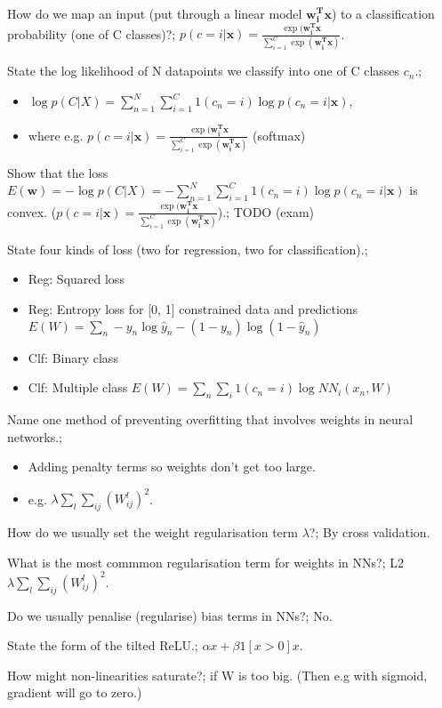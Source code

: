 \documentclass{article}
\begin{document}
How do we map an input (put through a linear model $\bm{w^T_ix}$) to a classification  probability (one of C classes)?; $p(c = i|\bm{x}) = \frac{\exp (\bm{w_i^Tx}}{\sum_{i=1}^C\exp(\bm{w^T_i x})}$.

State the log likelihood of N datapoints we classify into one of C classes $c_n$.; \begin{itemize} \item $\log p(C|X) = \sum_{n=1}^N \sum_{i=1}^C 1(c_n = i)\log  p(c_n = i|\bm{x})$,  \item where e.g. $p(c = i|\bm{x}) = \frac{\exp (\bm{w_i^Tx}}{\sum_{i=1}^C\exp(\bm{w^T_i x})}$ (softmax) \end{itemize}

Show that the loss $E(\bm{w}) = -\log p(C|X) =- \sum_{n=1}^N \sum_{i=1}^C 1(c_n = i)\log p(c_n = i|\bm{x})$ is convex. ($p(c = i|\bm{x}) = \frac{\exp (\bm{w_i^Tx}}{\sum_{i=1}^C\exp(\bm{w^T_i x})}$).; TODO (exam)

State four kinds of loss (two for regression, two for classification).; \begin{itemize} \item Reg: Squared loss \item Reg: Entropy loss for [0, 1] constrained data and predictions $E(W) = \sum_n -y_n\log \hat{y}_n - (1-y_n)\log (1-\hat{y}_n)$ \item Clf: Binary class \item Clf: Multiple class $E(W) = \sum_n\sum_i 1(c_n = i)\log NN_i(x_n, W)$ \end{itemize}

Name one method of preventing overfitting that involves weights in neural networks.; \begin{itemize} \item Adding penalty terms so weights don't get too large. \item e.g. $\lambda \sum_l \sum_{ij}(W^l_{ij})^2$. \end{itemize}

How do we usually set the weight regularisation term $\lambda$?; By cross validation.

What is the most commmon regularisation term for weights in NNs?; L2 $\lambda\sum_l\sum_{ij}(W^l_{ij})^2$.

Do we usually penalise (regularise) bias terms in NNs?; No.

State the form of the tilted ReLU.; $\alpha x + \beta 1[x > 0] x$.

How might non-linearities saturate?; if W is too big. (Then e.g with sigmoid, gradient will go to zero.)
\end{document}
